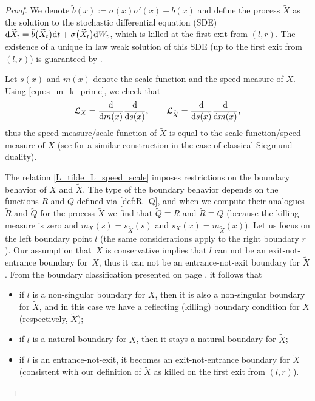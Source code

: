 \documentclass[10pt,a4paper]{amsart}
\numberwithin{equation}{section}
\theoremstyle{definition}
\def\L{{\mathcal L}}
\def\d{{\textnormal d}}
\begin{document}
\begin{proof}
We denote $\tilde b(x):=\sigma(x)\sigma'(x) - b(x)$ and define the process $\widetilde X$ as the solution to the stochastic differential equation (SDE)
$
\d \widetilde X_t=\tilde b\bigl(\widetilde X_t\bigr) \d t+\sigma\bigl(\widetilde X_t\bigr) \d W_t$,
which is killed at the first exit from $(l,r)$. The existence of a unique in law weak solution of this SDE (up to the first exit from $(l,r)$) is guaranteed by \cite[Theorem 5.15]{Karatzas_Shreve_1988}.

Let $s(x)$ and $m(x)$ denote the scale function and the speed measure of $X$. Using \eqref{eqn:s_m_k_prime}, we check that
 \begin{equation}\label{L_tilde_L_speed_scale}
 \L_X=\frac{\d}{\d m(x)}\frac{\d}{\d s(x)}, \qquad
 \L_{\widetilde X}=\frac{\d}{\d s(x)}\frac{\d}{\d m(x)},
 \end{equation}
thus the speed measure/scale function of $\widetilde X$ is equal to the scale function/speed measure of $X$ (see \cite[Section 4]{Cox_1984} for a similar construction in the case of classical Siegmund duality).

The relation \eqref{L_tilde_L_speed_scale} imposes restrictions on the boundary behavior of $X$ and $\widetilde X$. The type of the boundary behavior depends on the functions $R$ and $Q$ defined via \eqref{def:R_Q}, and when we compute their analogues $\widetilde R$ and $\widetilde Q$ for the process $\widetilde X$ we find that
 $\widetilde Q\equiv R$ and $\widetilde R \equiv Q$ (because the killing measure is zero and
 $m_X(s)=s_{\widetilde X}(s)$ and $s_X(x)=m_{\widetilde X}(x)$).
 Let us focus on the left boundary point $l$ (the same considerations apply to the right boundary $r$). Our assumption that~$X$ is conservative implies that $l$ can not be an exit-not-entrance boundary for~$X$, thus it can not be an entrance-not-exit boundary for $\widetilde X$. From the boundary classification presented on page \pageref{def:R_Q}, it follows that
\begin{itemize}\itemsep=0pt
\item[(i)] if $l$ is a non-singular boundary for $X$, then it is also a non-singular boundary for $\widetilde X$, and in this case we have a reflecting (killing) boundary condition for $X$ (respectively, $\widetilde X$);
\item[(ii)] if $l$ is a natural boundary for $X$, then it stays a natural boundary for $\widetilde X$;
\item[(iii)] if $l$ is an entrance-not-exit, it becomes an exit-not-entrance boundary for $\widetilde X$ (consistent with our definition of $\widetilde X$ as killed on the first exit from $(l,r)$).
\end{itemize}


\end{proof}
\end{document}
